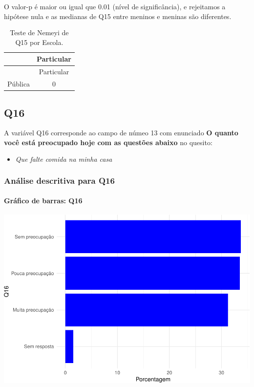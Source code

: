 \documentclass[]{article}
\providecommand{\tightlist}{%
  \setlength{\itemsep}{0pt}\setlength{\parskip}{0pt}}
\let\oldparagraph\paragraph
\renewcommand{\paragraph}[1]{\oldparagraph{#1}\mbox{}}
\begin{document}
O valor-p é maior ou igual que 0.01 (nível de significância), e rejeitamos a hipótese nula e as medianas de Q15 entre meninos e meninas são diferentes.

\begin{longtable}[]{@{}lc@{}}
\caption{\label{tab:unnamed-chunk-120}Teste de Nemeyi de Q15 por Escola.}\tabularnewline
\toprule
& Particular\tabularnewline
\midrule
\endfirsthead
\toprule
& Particular\tabularnewline
\midrule
\endhead
Pública & 0\tabularnewline
\bottomrule
\end{longtable}

\cleardoublepage

\hypertarget{q16}{%
\subsection{Q16}\label{q16}}

A variável Q16 corresponde ao campo de númeo 13 com enunciado \textbf{O quanto você está preocupado hoje com as questões abaixo} no quesito:

\begin{itemize}
\tightlist
\item
  \emph{Que falte comida na minha casa}
\end{itemize}

\hypertarget{anuxe1lise-descritiva-para-q16}{%
\subsubsection{Análise descritiva para Q16}\label{anuxe1lise-descritiva-para-q16}}

\hypertarget{gruxe1fico-de-barras-q16}{%
\paragraph{Gráfico de barras: Q16}\label{gruxe1fico-de-barras-q16}}

\begin{center}\includegraphics[width=0.75\linewidth]{relatorio_covid19_files/figure-latex/unnamed-chunk-127-1} \end{center}
\end{document}
